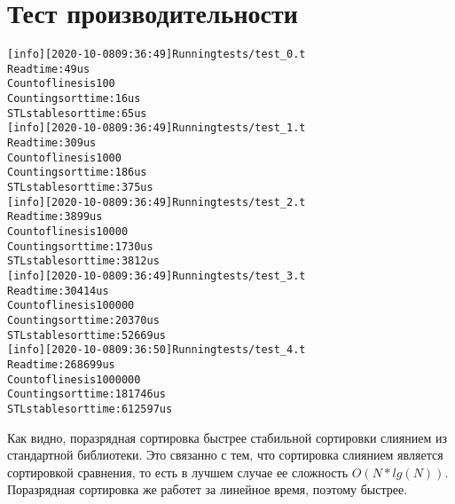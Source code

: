 \section{Тест производительности}

\begin{alltt}
	[info] [2020-10-08 09:36:49] Running tests/test_0.t
	Read time: 49us
	Count of lines is 100
	Counting sort time: 16us
	STL stable sort time: 65us
	[info] [2020-10-08 09:36:49] Running tests/test_1.t
	Read time: 309us
	Count of lines is 1000
	Counting sort time: 186us
	STL stable sort time: 375us
	[info] [2020-10-08 09:36:49] Running tests/test_2.t
	Read time: 3899us
	Count of lines is 10000
	Counting sort time: 1730us
	STL stable sort time: 3812us
	[info] [2020-10-08 09:36:49] Running tests/test_3.t
	Read time: 30414us
	Count of lines is 100000
	Counting sort time: 20370us
	STL stable sort time: 52669us
	[info] [2020-10-08 09:36:50] Running tests/test_4.t
	Read time: 268699us
	Count of lines is 1000000
	Counting sort time: 181746us
	STL stable sort time: 612597us
\end{alltt}

Как видно, поразрядная сортировка быстрее стабильной сортировки слиянием из стандартной библиотеки. Это связанно с тем, что сортировка слиянием является сортировкой сравнения, то есть в лучшем случае ее сложность $O(N*lg(N))$. Поразрядная сортировка же работет за линейное время, поэтому быстрее. 
\pagebreak

